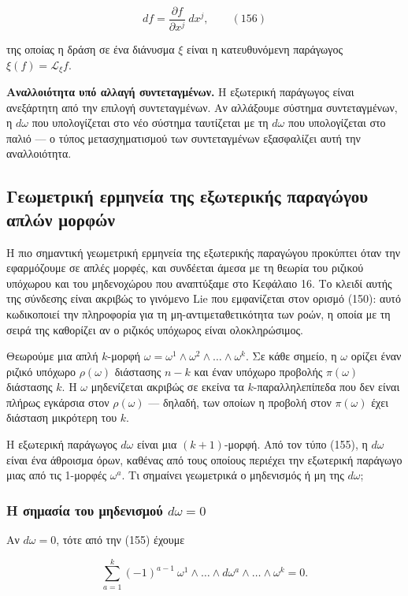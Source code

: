 \documentclass[12pt]{article}
\begin{document}
\[
df = \frac{\partial f}{\partial x^j} \ dx^j, \qquad (156)
\]

της οποίας η δράση σε ένα διάνυσμα $\xi$ είναι η κατευθυνόμενη παράγωγος $\xi(f) = \mathcal{L}_\xi f$.

\textbf{Αναλλοιότητα υπό αλλαγή συντεταγμένων.} Η εξωτερική παράγωγος είναι ανεξάρτητη από την επιλογή συντεταγμένων. Αν αλλάξουμε σύστημα συντεταγμένων, η $d\omega$ που υπολογίζεται στο νέο σύστημα ταυτίζεται με τη $d\omega$ που υπολογίζεται στο παλιό — ο τύπος μετασχηματισμού των συντεταγμένων εξασφαλίζει αυτή την αναλλοιότητα.

\subsection{Γεωμετρική ερμηνεία της εξωτερικής παραγώγου απλών μορφών}

Η πιο σημαντική γεωμετρική ερμηνεία της εξωτερικής παραγώγου προκύπτει όταν την εφαρμόζουμε σε απλές μορφές, και συνδέεται άμεσα με τη θεωρία του ριζικού υπόχωρου και του μηδενοχώρου που αναπτύξαμε στο Κεφάλαιο 16. Το κλειδί αυτής της σύνδεσης είναι ακριβώς το γινόμενο Lie που εμφανίζεται στον ορισμό (150): αυτό κωδικοποιεί την πληροφορία για τη μη-αντιμεταθετικότητα των ροών, η οποία με τη σειρά της καθορίζει αν ο ριζικός υπόχωρος είναι ολοκληρώσιμος.

Θεωρούμε μια απλή $k$-μορφή $\omega = \omega^1 \wedge \omega^2 \wedge \dots \wedge \omega^k$. Σε κάθε σημείο, η $\omega$ ορίζει έναν ριζικό υπόχωρο $\rho(\omega)$ διάστασης $n-k$ και έναν υπόχωρο προβολής $\pi(\omega)$ διάστασης $k$. Η $\omega$ μηδενίζεται ακριβώς σε εκείνα τα $k$-παραλληλεπίπεδα που δεν είναι πλήρως εγκάρσια στον $\rho(\omega)$ — δηλαδή, των οποίων η προβολή στον $\pi(\omega)$ έχει διάσταση μικρότερη του $k$.

Η εξωτερική παράγωγος $d\omega$ είναι μια $(k+1)$-μορφή. Από τον τύπο (155), η $d\omega$ είναι ένα άθροισμα όρων, καθένας από τους οποίους περιέχει την εξωτερική παράγωγο μιας από τις 1-μορφές $\omega^a$. Τι σημαίνει γεωμετρικά ο μηδενισμός ή μη της $d\omega$;

\subsubsection{Η σημασία του μηδενισμού $d\omega = 0$}

Αν $d\omega = 0$, τότε από την (155) έχουμε

\[
\sum_{a=1}^{k} (-1)^{a-1} \ \omega^1 \wedge \dots \wedge d\omega^a \wedge \dots \wedge \omega^k = 0.
\]
\end{document}
